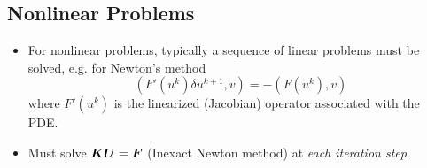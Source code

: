 \subsection*{Nonlinear Problems}
\begin{frame}
  \begin{itemize}
	\item{For nonlinear problems, typically a sequence of linear problems must be solved, e.g.
	  for Newton's method
	  \begin{equation}
	    \nonumber
	    (F'( u^k ) \delta u^{k+1}, v) = -(F( u^k ), v) 
	  \end{equation}
	  where $F'( u^k )$ is the linearized (Jacobian) operator associated with
	  the PDE.	}

	\item{Must solve ${\boldsymbol{K}} {\boldsymbol{U}} = {\boldsymbol{F}}$ (Inexact Newton method) at \emph{each iteration step}.}
  \end{itemize}
\end{frame}
